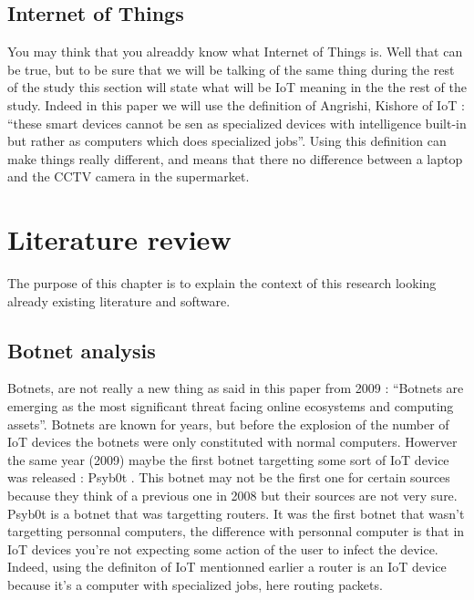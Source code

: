\documentclass{report}
\begin{document}
\section{Internet of Things}
You may think that you alreaddy know what Internet of Things is. Well that can be true, but to be sure that we will be talking of the same thing during the rest of the study this section will state what will be IoT meaning in the the rest of the study. Indeed in this paper we will use the definition of Angrishi, Kishore \autocite{angrishi2017turning} of IoT : ``these smart devices cannot be sen as specialized devices with intelligence built-in but rather as computers which does specialized jobs''. Using this definition can make things really different, and means that there no difference between a laptop and the CCTV camera in the supermarket.

\chapter{Literature review}
The purpose of this chapter is to explain the context of this research looking already existing literature and software.\newline
\newline

\section{Botnet analysis}
Botnets, are not really a new thing as said in this paper from 2009 \autocite{feily2009survey} : ``Botnets are emerging as the most significant threat facing online ecosystems and computing assets''. Botnets are known for years, but before the explosion of the number of IoT devices the botnets were only constituted with normal computers. Howerver the same year (2009) maybe the first botnet targetting some sort of IoT device was released : Psyb0t \autocite{durfina2013psybot}. This botnet may not be the first one for certain sources \autocite{angrishi2017turning} because they think of a previous one in 2008 but their sources are not very sure. Psyb0t is a botnet that was targetting routers. It was the first botnet that wasn't targetting personnal computers, the difference with personnal computer is that in IoT devices you're not expecting some action of the user to infect the device. Indeed, using the definiton of IoT mentionned earlier a router is an IoT device because it's a computer with specialized jobs, here routing packets.
\end{document}
